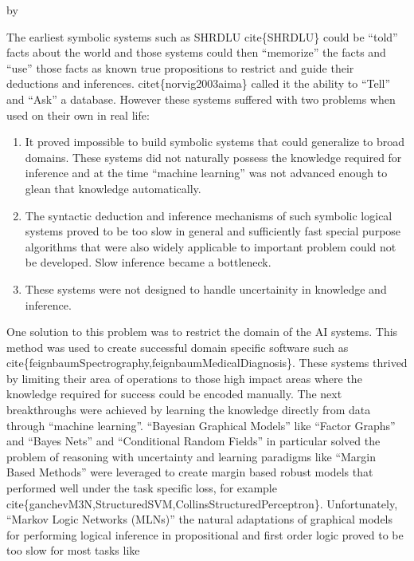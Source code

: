 \documentclass[12pt]{exam} %
\makeatletter
\renewcommand{\cite}[1]{cite\{#1\}}
\newcommand{\citet}[1]{citet\{#1\}}
\def\SetTotalwidth{\advance\linewidth by \@totalleftmargin
\@totalleftmargin=0pt}
\newcommand{\answer}[1]{
\ifprintanswers
\SetTotalwidth
  \begin{solution}[0in]#1\end{solution}
\else \fi
}
\makeatother
\begin{document}
\begin{questions}
  \answer{The earliest symbolic systems such as SHRDLU \cite{SHRDLU}
    could be ``told'' facts about the world and those systems could
    then ``memorize'' the facts and ``use'' those facts as known true
    propositions to restrict and guide their deductions and
    inferences. \citet{norvig2003aima} called it the ability to
    ``Tell'' and ``Ask'' a database. However these systems suffered
    with two problems when used on their own in real life:
    \begin{enumerate}
    \item It proved impossible to build symbolic systems that could
      generalize to broad domains. These systems did not naturally
      possess the knowledge required for inference and at the time
      ``machine learning'' was not advanced enough to glean that
      knowledge automatically.
    \item The syntactic deduction and inference mechanisms of such
      symbolic logical systems proved to be too slow in general and
      sufficiently fast special purpose algorithms that were also
      widely applicable to important problem could not be
      developed. Slow inference became a bottleneck.
    \item These systems were not designed to handle uncertainity in
      knowledge and inference.
    \end{enumerate} One solution to this problem was to restrict the
    domain of the AI systems. This method was used to create
    successful domain specific software such as
    \cite{feignbaumSpectrography,feignbaumMedicalDiagnosis}. These
    systems thrived by limiting their area of operations to those high
    impact areas where the knowledge required for success could be
    encoded manually. The next breakthroughs were achieved by learning
    the knowledge directly from data through ``machine
    learning''. ``Bayesian Graphical Models'' like ``Factor Graphs''
    and ``Bayes Nets'' and ``Conditional Random Fields'' in particular
    solved the problem of reasoning with uncertainty and learning
    paradigms like ``Margin Based Methods'' were leveraged to create
    margin based robust models that performed well under the task
    specific loss, for example
    \cite{ganchevM3N,StructuredSVM,CollinsStructuredPerceptron}. Unfortunately,
    ``Markov Logic Networks (MLNs)'' the natural adaptations of
    graphical models for performing logical inference in propositional
    and first order logic proved to be too slow for most tasks like
}
\end{questions}
\end{document}
